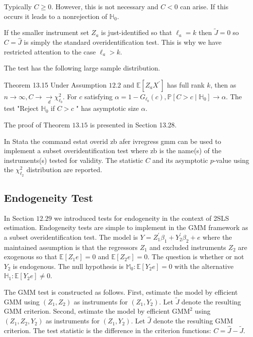 \documentclass[10pt]{article}
\begin{document}
Typically $C \geq 0$. However, this is not necessary and $C<0$ can arise. If this occurs it leads to a nonrejection of $\mathbb{H}_{0}$.

If the smaller instrument set $Z_{a}$ is just-identified so that $\ell_{a}=k$ then $\widetilde{J}=0$ so $C=\widehat{J}$ is simply the standard overidentification test. This is why we have restricted attention to the case $\ell_{a}>k$.

The test has the following large sample distribution.

Theorem 13.15 Under Assumption $12.2$ and $\mathbb{E}\left[Z_{a} X^{\prime}\right]$ has full rank $k$, then as $n \rightarrow \infty, C \rightarrow \underset{d}{\rightarrow} \chi_{\ell_{b}}^{2} .$ For $c$ satisfying $\alpha=1-G_{\ell_{b}}(c), \mathbb{P}\left[C>c \mid \mathbb{H}_{0}\right] \longrightarrow \alpha .$ The test "Reject $\mathbb{H}_{0}$ if $C>c$ " has asymptotic size $\alpha$.

The proof of Theorem $13.15$ is presented in Section 13.28.

In Stata the command estat overid zb afer ivregress gmm can be used to implement a subset overidentification test where $\mathrm{zb}$ is the name(s) of the instruments(s) tested for validity. The statistic $C$ and its asymptotic $p$-value using the $\chi_{\ell_{2}}^{2}$ distribution are reported.

\subsection{Endogeneity Test}
In Section $12.29$ we introduced tests for endogeneity in the context of 2SLS estimation. Endogeneity tests are simple to implement in the GMM framework as a subset overidentification test. The model is $Y=Z_{1}^{\prime} \beta_{1}+Y_{2}^{\prime} \beta_{2}+e$ where the maintained assumption is that the regressors $Z_{1}$ and excluded instruments $Z_{2}$ are exogenous so that $\mathbb{E}\left[Z_{1} e\right]=0$ and $\mathbb{E}\left[Z_{2} e\right]=0$. The question is whether or not $Y_{2}$ is endogenous. The null hypothesis is $\mathbb{M}_{0}: \mathbb{E}\left[Y_{2} e\right]=0$ with the alternative $\mathbb{H}_{1}: \mathbb{E}\left[Y_{2} e\right] \neq 0$.

The GMM test is constructed as follows. First, estimate the model by efficient GMM using $\left(Z_{1}, Z_{2}\right)$ as instruments for $\left(Z_{1}, Y_{2}\right)$. Let $\widetilde{J}$ denote the resulting GMM criterion. Second, estimate the model by efficient $\mathrm{GMM}^{2}$ using $\left(Z_{1}, Z_{2}, Y_{2}\right)$ as instruments for $\left(Z_{1}, Y_{2}\right)$. Let $\widehat{J}$ denote the resulting GMM criterion. The test statistic is the difference in the criterion functions: $C=\widehat{J}-\widetilde{J}$.
\end{document}
